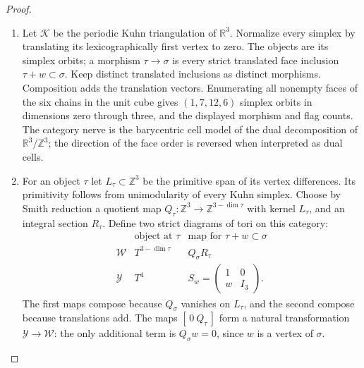 \documentclass[11pt,a4paper]{article}
\theoremstyle{definition}
\begin{document}
\begin{proof}
\begin{enumerate}[label=\arabic*.]
\item Let $\mathcal K$ be the periodic Kuhn triangulation of
$\mathbb R^3$.  Normalize every simplex by translating its
lexicographically first vertex to zero.  The objects are its
simplex orbits; a morphism $\tau\to\sigma$ is every strict
translated face inclusion $\tau+w\subset\sigma$.
Keep distinct translated inclusions as distinct morphisms.
Composition adds the translation vectors.  Enumerating all
nonempty faces of the six chains in the unit cube gives
$(1,7,12,6)$ simplex orbits in dimensions zero through three,
and the displayed morphism and flag counts.  The category
nerve is the barycentric cell model of the dual decomposition
of $\mathbb R^3/\mathbb Z^3$; the direction of the face order
is reversed when interpreted as dual cells.

\item For an object $\tau$ let $L_\tau\subset\mathbb Z^3$ be the
primitive span of its vertex differences.  Its primitivity
follows from unimodularity of every Kuhn simplex.  Choose by
Smith reduction a quotient map
$Q_\tau:\mathbb Z^3\to\mathbb Z^{3-\dim\tau}$ with kernel
$L_\tau$, and an integral section $R_\tau$.
Define two strict diagrams of tori on this category:
\[
\begin{array}{c|c|c}
 &\text{object at }\tau&\text{map for }\tau+w\subset\sigma\\\hline
\mathcal W&T^{3-\dim\tau}&Q_\sigma R_\tau\\
\mathcal Y&T^4&S_w=\begin{pmatrix}1&0\\ w&I_3\end{pmatrix}.
\end{array}                                                \tag{F.CK2}\label{maps:eq:F.CK2}
\]
The first maps compose because $Q_\sigma$ vanishes on
$L_\tau$, and the second compose because translations add.
The maps $[\,0\ Q_\tau\,]$ form a natural transformation
$\mathcal Y\to\mathcal W$: the only additional term is
$Q_\sigma w=0$, since $w$ is a vertex of $\sigma$.


\end{enumerate}
\end{proof}
\end{document}
